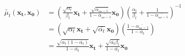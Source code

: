 \begin{equation}
	\begin{aligned}
		\tilde{\mu_t}(\mathbf{x_t}, \mathbf{x_0}) &= \left( \frac{\sqrt{\alpha_t}}{\beta_t} \mathbf{x_t} + \frac{\sqrt{\bar{\alpha_{ت-1}}}}{1 - \bar{\alpha_{ت-1}}} \mathbf{x_0} \right) \left( \frac{\alpha_t}{\beta_t} + \frac{1}{1 - \bar{\alpha_{ت-1}}} \right)^{-1} \\
		&= \left( \sqrt{\alpha_t} \mathbf{x_t} + \sqrt{\bar{\alpha_t}} \mathbf{x_0} \right) \left( \frac{1 - \bar{\alpha_{ت-1}}}{1 - \bar{\alpha_t}} \right) \\
		&= \frac{\sqrt{\alpha_t (1 - \bar{\alpha_t})}}{1 - \bar{\alpha_t}} \mathbf{x_t} + \frac{\sqrt{\bar{\alpha_t} \beta_t}}{1 - \bar{\alpha_t}} \mathbf{x_0}
	\end{aligned}
\end{equation}


